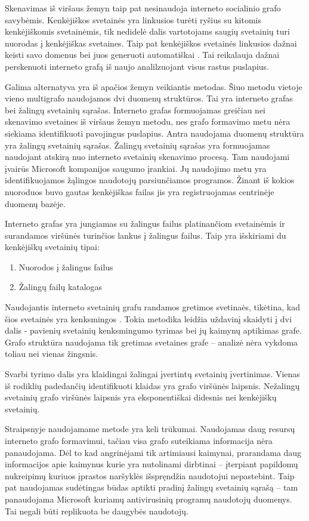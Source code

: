 Skenavimas iš viršaus žemyn taip pat nesinaudoja interneto socialinio grafo savybėmis. Kenkėjiškos svetainės yra linkusios
turėti ryšius su kitomis kenkėjiškomis svetainėmis, tik nedidelė dalis vartotojams saugių svetainių turi nuorodas į
kenkėjiškas svetaines. Taip pat kenkėjiškos svetainės linkusios dažnai keisti savo domenus \cite{webcop} bei juos
generuoti automatiškai \cite{trees}. Tai reikalauja dažnai perskenuoti interneto grafą iš naujo analilzuojant visus
rastus puslapius.

Galima alternatyva yra iš apačios žemyn veikiantis metodas. Šiuo metodu vietoje vieno multigrafo naudojamos dvi duomenų
struktūros. Tai yra interneto grafas bei žalingų svetainių sąrašas. Interneto grafas formuojamas greičiau nei skenavimo
svetaines iš viršaus žemyn metodu, nes grafo formavimo metu nėra siekiama identifikuoti pavojingus puslapius. Antra naudojama
duomenų struktūra yra žalingų svetainių sąrašas. Žalingų svetainių sąrašas yra formuojamas naudojant atskirą nuo
interneto svetainių skenavimo procesą. Tam naudojami įvairūs Microsoft kompanijos saugumo įrankiai. Jų naudojimo metu
yra identifikuojamos žąlingos naudotojų parsiunčiamos programos. Žinant iš kokios nuoroduos buvo gautas kenkėjiškas failas
jis yra registruojamas centrinėje duomenų bazėje.

Interneto grafas yra jungiamas su žalingus failus platinančiom svetainėmis ir surandamos viršūnės turinčios lankus į žalingus failus.
Taip yra išskiriami du kenkėjiškų svetainių tipai:
\begin{enumerate}[label=\alph*]
    \item Nuorodos į žalingus failus
    \item Žalingų failų katalogas
\end{enumerate}
Naudojantis interneto svetainių grafu randamos gretimos svetinaės, tikėtina, kad šios svetainės yra kenksmingos \cite{webcop}.
Tokia metodika leidžia uždavinį skaidyti į dvi dalis - pavienių svetainių kenksmingumo tyrimas bei jų kaimynų aptikimas grafe.
Grafo struktūra naudojama tik gretimas svetaines grafe -- analizė nėra vykdoma toliau nei vienas žingsnis.

Svarbi \cite{webcop} tyrimo dalis yra klaidingai žalingai įvertintų svetainių įvertinimas. Vienas iš rodiklių
padedančių identifikuoti klaidas yra grafo viršūnės laipsnis. Nežalingų svetainių grafo viršūnės laipsnis yra
eksponentiškai didesnis nei kenkėjiškų svetainių.

Straipsnyje \cite{webcop} naudojamame metode yra keli trūkumai. Naudojamas daug resursų interneto grafo formavimui,
tačiau visa grafo suteikiama informacija nėra panaudojama. Dėl to kad angrinėjami tik artimiausi kaimynai, prarandama
daug informacijos apie kaimynus kurie yra nutolinami dirbtinai -- įterpiant papildomų nukreipimų kuriuos įprastos
naršyklės išspręndžia naudotojui nepastebint. Taip pat naudojamas sudėtingas būdas aptikti pradinį žalingų svetainių
sąrašą -- tam panaudojama Microsoft kuriamų antivirusinių programų naudotojų duomenys.
Tai negali būti replikuota be daugybės naudotojų.


\newpage